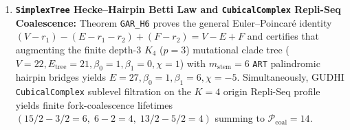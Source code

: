\documentclass[11pt,a4paper]{article}
\theoremstyle{definition}
\begin{document}
\begin{enumerate}
  \item \textbf{\texttt{SimplexTree} Hecke--Hairpin Betti Law and \texttt{CubicalComplex} Repli-Seq Coalescence:} Theorem \texttt{GAR\_H6} proves the general Euler--Poincar\'e identity $(V - r_1) - (E - r_1 - r_2) + (F - r_2) = V - E + F$ and certifies that augmenting the finite depth-$3$ $K_4$ ($p=3$) mutational clade tree ($V = 22, E_{\mathrm{tree}} = 21, \beta_0 = 1, \beta_1 = 0, \chi = 1$) with $m_{\mathrm{stem}} = 6$ \texttt{ART} palindromic hairpin bridges yields $E = 27, \beta_0 = 1, \beta_1 = 6, \chi = -5$. Simultaneously, GUDHI \texttt{CubicalComplex} sublevel filtration on the $K=4$ origin Repli-Seq profile yields finite fork-coalescence lifetimes $(15/2 - 3/2 = 6,\; 6 - 2 = 4,\; 13/2 - 5/2 = 4)$ summing to $\mathcal{P}_{\mathrm{coal}} = 14$.
\end{enumerate}
\end{document}
